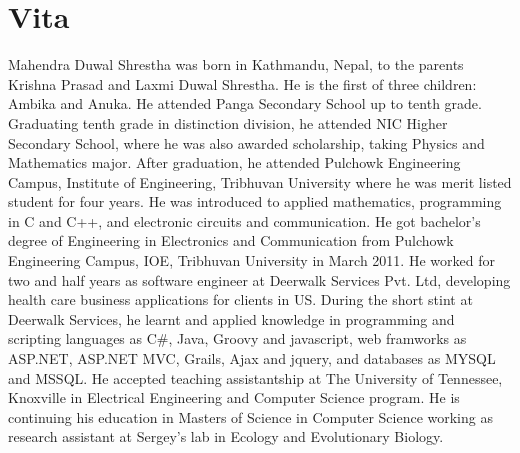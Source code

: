 \chapter*{Vita} \label{ch:vita}
Mahendra Duwal Shrestha was born in Kathmandu, Nepal, 
to the parents Krishna Prasad and Laxmi Duwal Shrestha. 
He is the first of three children: Ambika and Anuka. 
He attended Panga Secondary School up to tenth grade. 
Graduating tenth grade in distinction division, he attended 
NIC Higher Secondary School, where he was also awarded scholarship, taking Physics and Mathematics major. 
After graduation, he attended Pulchowk Engineering Campus, Institute of Engineering, Tribhuvan University 
where he was merit listed student for four years. He was introduced to applied mathematics, programming in 
C and C++, and electronic circuits and communication. 
He got bachelor's degree of Engineering in Electronics and Communication 
from Pulchowk Engineering Campus, IOE, Tribhuvan University in March 2011. 
He worked for two and half years as software engineer at Deerwalk Services Pvt. Ltd, 
developing health care business applications for clients in US. 
During the short stint at Deerwalk Services, he learnt and applied knowledge in programming and scripting languages as C$\#$, 
Java, Groovy and javascript, web framworks as ASP.NET, ASP.NET MVC, Grails, Ajax and jquery, and databases as MYSQL and MSSQL. 
He accepted teaching assistantship at The University of Tennessee, Knoxville in Electrical Engineering and Computer Science 
program. He is continuing his education in Masters of Science in Computer Science working as research assistant at Sergey's lab 
in Ecology and Evolutionary Biology.

